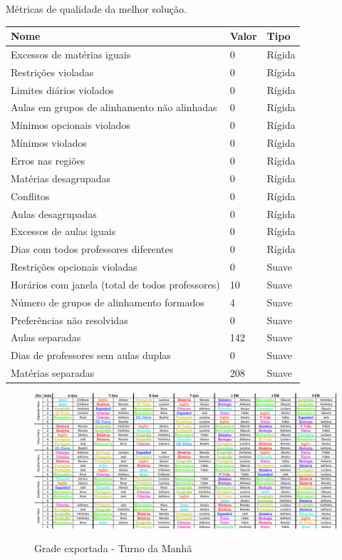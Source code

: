 \begin{quadro}
	\centering
	\caption{Métricas de qualidade da melhor solução.\label{qua:caracteristicas_horario_validacao}}
	\begin{tabular}{|p{8cm}|p{1cm}|p{3cm}|}
		\hline
		\textbf{Nome} & \textbf{Valor} & \textbf{Tipo} \\
		\hline
		Excessos de matérias iguais & 0 & Rígida \\
		\hline
		Restrições violadas & 0 & Rígida \\
		\hline
		Limites diários violados & 0 & Rígida \\
		\hline
		Aulas em grupos de alinhamento não alinhadas & 0 & Rígida \\
		\hline
		Mínimos opcionais violados & 0 & Rígida \\
		\hline
		Mínimos violados & 0 & Rígida \\
		\hline
		Erros nas regiões & 0 & Rígida \\
		\hline
		Matérias desagrupadas & 0 & Rígida \\
		\hline
		Conflitos & 0 & Rígida \\
		\hline
		Aulas desagrupadas & 0 & Rígida \\
		\hline
		Excessos de aulas iguais & 0 & Rígida \\
		\hline
		Dias com todos professores diferentes & 0 & Rígida \\
		\hline
		Restrições opcionais violadas & 0 & Suave \\
		\hline
		Horários com janela (total de todos professores) & 10 & Suave \\
		\hline
		Número de grupos de alinhamento formados & 4 & Suave \\
		\hline
		Preferências não resolvidas & 0 & Suave \\
		\hline
		Aulas separadas & 142 & Suave \\
		\hline
		Dias de professores sem aulas duplas & 0 & Suave \\
		\hline
		Matérias separadas & 208 & Suave \\
		\hline
	\end{tabular}
\end{quadro}

\begin{figure}
	\centering
	\caption{Grade exportada - Turno da Manhã}
	\includegraphics[width=1\textwidth]{./dados/figuras/planilha_exportada_manha}
	\label{fig:planilha_exportada_manha}
\end{figure}

